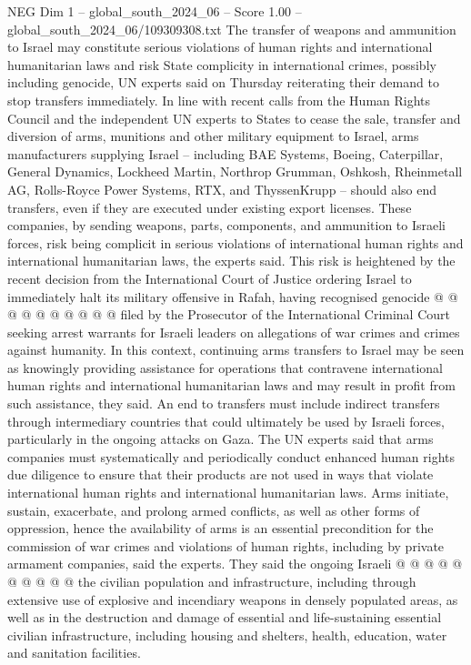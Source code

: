 \begin{textsample}{NEG Dim 1 – global\_south\_2024\_06 – Score 1.00 – global\_south\_2024\_06/109309308.txt}  \label{ex:f1_neg_321}
The transfer of weapons and ammunition to Israel may constitute serious violations of human rights and international humanitarian laws and risk State complicity in international crimes, possibly including genocide, UN experts said on Thursday reiterating their demand to stop transfers immediately.
In line with recent calls from the Human Rights Council and the independent UN experts to States to cease the sale, transfer and diversion of arms, munitions and other military equipment to Israel, arms manufacturers supplying Israel -- including BAE Systems, Boeing, Caterpillar, General Dynamics, Lockheed Martin, Northrop Grumman, Oshkosh, Rheinmetall AG, Rolls-Royce Power Systems, RTX, and ThyssenKrupp -- should also end transfers, even if they are executed under existing export licenses.
These companies, by sending weapons, parts, components, and ammunition to Israeli forces, risk being complicit in serious violations of international human rights and international humanitarian laws, the experts said.
This risk is heightened by the recent decision from the International Court of Justice ordering Israel to immediately halt its military offensive in Rafah, having recognised genocide @ @ @ @ @ @ @ @ @ @ filed by the Prosecutor of the International Criminal Court seeking arrest warrants for Israeli leaders on allegations of war crimes and crimes against humanity.
In this context, continuing arms transfers to Israel may be seen as knowingly providing assistance for operations that contravene international human rights and international humanitarian laws and may result in profit from such assistance, they said.
An end to transfers must include indirect transfers through intermediary countries that could ultimately be used by Israeli forces, particularly in the ongoing attacks on Gaza.
The UN experts said that arms companies must systematically and periodically conduct enhanced human rights due diligence to ensure that their products are not used in ways that violate international human rights and international humanitarian laws.
Arms initiate, sustain, exacerbate, and prolong armed conflicts, as well as other forms of oppression, hence the availability of arms is an essential precondition for the commission of war crimes and violations of human rights, including by private armament companies, said the experts.
They said the ongoing Israeli @ @ @ @ @ @ @ @ @ @ the civilian population and infrastructure, including through extensive use of explosive and incendiary weapons in densely populated areas, as well as in the destruction and damage of essential and life-sustaining essential civilian infrastructure, including housing and shelters, health, education, water and sanitation facilities.

\end{textsample}
